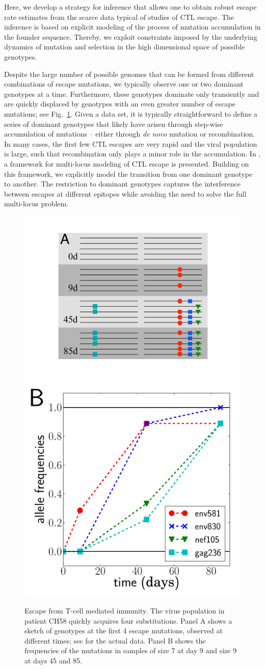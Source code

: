 \documentclass{frontiers}
\newcommand{\FIG}[1]{Fig.~\ref{fig:#1}}
\begin{document}
Here, we develop a strategy for inference that allows one to obtain robust escape 
rate estimates
from the scarce data typical of studies of CTL escape. The inference is based on
explicit modeling of the process of mutation accumulation in the founder
sequence. Thereby, we exploit constraints imposed by the underlying dynamics of
mutation and selection in the high dimensional space of possible genotypes.

Despite the large number of possible genomes that can be formed from different
combinations of escape mutations, we typically observe one or two dominant
genotypes at a time. Furthermore, these genotypes dominate only transiently and are
quickly displaced by genotypes with an even greater number of escape mutations;
see \FIG{data_example}. Given a data set, it is typically straightforward to
define a series of dominant genotypes that likely have arisen through
step-wise accumulation of mutations -- either through \textit{de novo} mutation or
recombination. In many cases, the first few CTL escapes are very rapid and the
viral population is large, such that recombination only plays a minor role in
the accumulation. In \citet{ganusov_mathematical_2013}, a 
framework for
multi-locus modeling of CTL escape is presented. Building on this framework, we 
explicitly model the
transition from one dominant genotype to another. The restriction to dominant
genotypes captures the interference between escapes at different epitopes while avoiding
the need to solve the full multi-locus problem.

\begin{figure}[tbp]
\begin{center}
  \includegraphics[width=0.26\columnwidth]{figures_manuscript/CH58_allele_demo}
  \includegraphics[width=0.22\columnwidth]{figures_manuscript/CH58_alleles}
  \caption[labelInTOC]{Escape from T-cell mediated immunity. The virus
  population in patient CH58 quickly acquires four substitutions. Panel A
shows a sketch of genotypes at the first 4 escape mutations, observed
  at different times; see \citep{SalazarGonzalez:2009p35091,Goonetilleke:2009p42296} 
  for the actual
  data. Panel B shows the frequencies of the mutations in samples of size 7 
  at day 9 and size 9 at days 45
  and 85.}
  \label{fig:data_example}
\end{center}
\end{figure}
\end{document}
